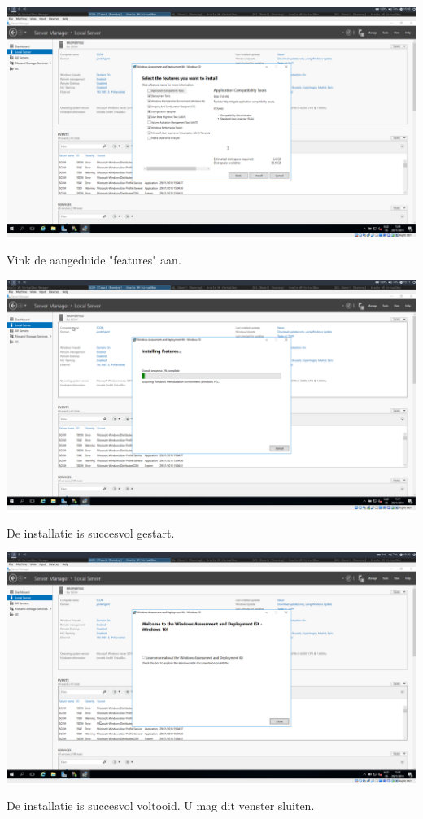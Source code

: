 \documentclass[a4paper]{article}
\begin{document}
\begin{center}
	\includegraphics[width=15cm]{Pictures/SCCM/4/1543500577.png}
	
	Vink de aangeduide "features" aan.
\end{center}
\begin{center}
	\includegraphics[width=15cm]{Pictures/SCCM/4/1543500666.png}
	
	De installatie is succesvol gestart.
\end{center}
\begin{center}
	\includegraphics[width=15cm]{Pictures/SCCM/4/1543501810.png}
	
	De installatie is succesvol voltooid. U mag dit venster sluiten.
\end{center}
\end{document}
